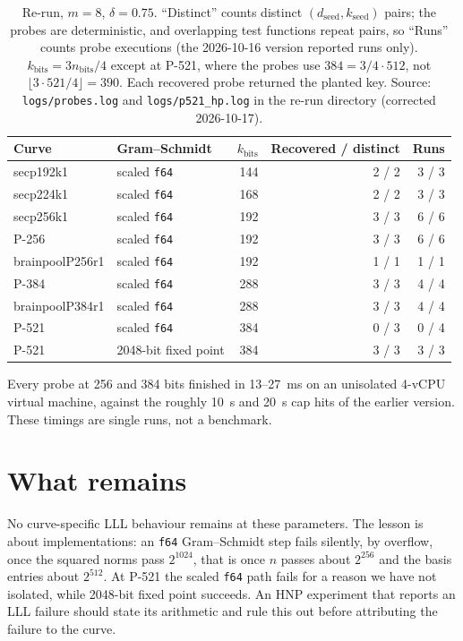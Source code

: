 \documentclass[10pt,a4paper]{article}
\begin{document}
\begin{table}[h]
\centering
\begin{tabular}{llrrr}
\toprule
Curve & Gram--Schmidt & $k_{\text{bits}}$ & Recovered / distinct & Runs \\
\midrule
secp192k1        & scaled \texttt{f64}  & 144 & 2 / 2 & 3 / 3 \\
secp224k1        & scaled \texttt{f64}  & 168 & 2 / 2 & 3 / 3 \\
secp256k1        & scaled \texttt{f64}  & 192 & 3 / 3 & 6 / 6 \\
P-256            & scaled \texttt{f64}  & 192 & 3 / 3 & 6 / 6 \\
brainpoolP256r1  & scaled \texttt{f64}  & 192 & 1 / 1 & 1 / 1 \\
P-384            & scaled \texttt{f64}  & 288 & 3 / 3 & 4 / 4 \\
brainpoolP384r1  & scaled \texttt{f64}  & 288 & 3 / 3 & 4 / 4 \\
P-521            & scaled \texttt{f64}  & 384 & 0 / 3 & 0 / 4 \\
P-521            & 2048-bit fixed point & 384 & 3 / 3 & 3 / 3 \\
\bottomrule
\end{tabular}
\caption{Re-run, $m = 8$, $\delta = 0.75$. ``Distinct'' counts
distinct $(d_{\text{seed}}, k_{\text{seed}})$ pairs; the probes are
deterministic, and overlapping test functions repeat pairs, so
``Runs'' counts probe executions (the 2026-10-16 version reported
runs only). $k_{\text{bits}} = 3 n_{\text{bits}}/4$ except at P-521,
where the probes use $384 = 3/4 \cdot 512$, not
$\lfloor 3 \cdot 521/4 \rfloor = 390$. Each recovered probe returned
the planted key. Source: \texttt{logs/probes.log} and
\texttt{logs/p521\_hp.log} in the re-run directory (corrected
2026-10-17).}
\label{tab:rerun}
\end{table}

Every probe at 256 and 384 bits finished in 13--27~ms on an
unisolated 4-vCPU virtual machine, against the roughly 10~s and 20~s
cap hits of the earlier version. These timings are single runs, not a
benchmark.

\section{What remains}

No curve-specific LLL behaviour remains at these parameters. The
lesson is about implementations: an \texttt{f64} Gram--Schmidt step
fails silently, by overflow, once the squared norms pass $2^{1024}$,
that is once $n$ passes about $2^{256}$ and the basis entries about
$2^{512}$. At P-521 the scaled \texttt{f64} path fails for a
reason we have not isolated, while 2048-bit fixed point succeeds. An HNP
experiment that reports an LLL failure should state its arithmetic
and rule this out before attributing the failure to the curve.
\end{document}
